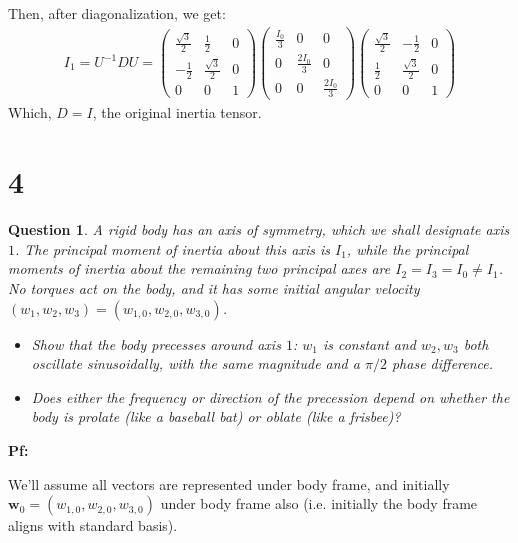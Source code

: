 \documentclass{article}
\newtheorem{question}{Question}
\newcommand{\bw}{\textbf{w}} %
\begin{document}
Then, after diagonalization, we get:
\begin{align}
    I_1 = U^{-1}DU = \begin{pmatrix}
        \frac{\sqrt{3}}{2}&\frac{1}{2}&0\\
        -\frac{1}{2}&\frac{\sqrt{3}}{2}&0\\
        0&0&1
    \end{pmatrix}\begin{pmatrix}
        \frac{I_0}{3}&0&0\\
        0&\frac{2I_0}{3}&0\\
        0&0&\frac{2I_0}{3}
    \end{pmatrix}\begin{pmatrix}
        \frac{\sqrt{3}}{2}&-\frac{1}{2}&0\\
        \frac{1}{2}&\frac{\sqrt{3}}{2}&0\\
        0&0&1
    \end{pmatrix}
\end{align}
Which, $D=I$, the original inertia tensor.

\break

\section*{4}
\begin{question}\label{q4}
    A rigid body has an axis of symmetry, which we shall designate axis $1$. The principal moment of inertia about this axis is $I_1$, while the principal moments of inertia about the remaining two principal axes are $I_2=I_3=I_0\neq I_1$. No torques act on the body, and it has some initial angular velocity $(w_1,w_2,w_3)=(w_{1,0},w_{2,0},w_{3,0})$.
    \begin{itemize}
        \item[(a)] Show that the body precesses around axis $1$: $w_1$ is constant and $w_2,w_3$ both oscillate sinusoidally, with the same magnitude and a $\pi/2$ phase difference.
        \item[(b)] Does either the frequency or direction of the precession depend on whether the body is prolate (like a baseball bat) or oblate (like a frisbee)? 
    \end{itemize}
\end{question}

\textbf{Pf:}

We'll assume all vectors are represented under body frame, and initially $\bw_0 = (w_{1,0},w_{2,0},w_{3,0})$ under body frame also (i.e. initially the body frame aligns with standard basis).
\end{document}
